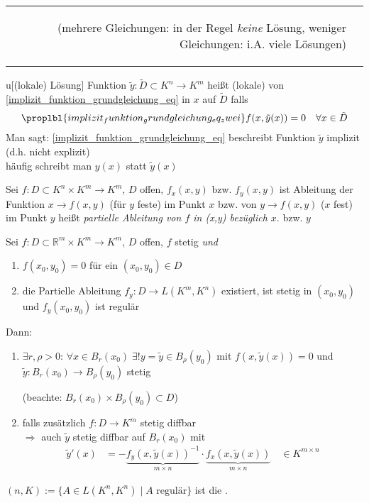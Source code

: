 \begin{example}
\begin{tabularx}{\linewidth}{r@{\ \ }X}
\begin{enumerate}[label={\alph*)}]
\begin{description}
				(mehrere Gleichungen: in der Regel \emph{keine} Lösung, weniger Gleichungen: i.A. viele Lösungen)
			\end{description}
		\end{enumerate}
	\end{tabularx}
\end{example}

\begin{*definition}u[(lokale) Lösung]
	Funktion $\tilde{y}:\tilde{D}\subset K^n\to K^m$ heißt (lokale)  von \eqref{implizit_funktion_grundgleichung_eq} in $x$ auf $\tilde{D}$ falls \begin{align}
		\proplbl{implizit_funktion_grundgleichung_eq_zwei}
		f(x,\tilde{y}(x)) = 0 \quad\forall x\in\tilde{D}
	\end{align}
	Man sagt: \eqref{implizit_funktion_grundgleichung_eq} beschreibt Funktion $\tilde{y}$ implizit (d.h. nicht explizit)\\
	häufig schreibt man $y(x)$ statt $\tilde{y}(x)$
\end{*definition}

Sei $f:D\subset K^n\times K^m\to K^m$, $D$ offen, $f_x(x,y)$ bzw. $f_y(x,y)$ ist Ableitung der Funktion $x\to f(x,y)$ (für $y$ feste) im Punkt $x$ bzw. von $y\to f(x,y)$ ($x$ fest) im Punkt $y$ heißt \emph{partielle Ableitung von $f$ in (x,y) bezüglich $x$}. bzw. $y$

\begin{theorem}
	Sei $f:D\subset \mathbb{R}^m \times K^m\to K^m$, $D$ offen, $f$ stetig \emph{und} \begin{enumerate}[label={\alph*)}]
		\item $f(x_0, y_0) = 0$ für ein $(x_0, y_0)\in D$
		\item die Partielle Ableitung $f_y:D\to L(K^m, K^n)$ existiert, ist stetig in $(x_0, y_0)$ und $f_y(x_0, y_0)$ ist regulär
	\end{enumerate}
	Dann:\begin{enumerate}[label={\arabic*)}]
		\item $\exists r,\rho > 0$: $\forall x\in B_r(x_0)\;\exists! y=\tilde{y}\in B_\rho(y_0)$ mit $f(x,\tilde{y}(x)) = 0$ und $\tilde{y}:B_r(x_0)\to B_\rho(y_0)$ stetig
		
		(beachte: $B_r(x_0)\times B_\rho(y_0)\subset D$)
		
		\item {}
		falls zusätzlich $f:D\to K^m$ stetig \gls{diffbar}\\
		$\Rightarrow$ auch $\tilde{y}$ stetig \gls{diffbar} auf $B_r(x_0)$ mit \begin{align*}
			\tilde{y}'(x) &= -\underbrace{f_y(x,\tilde{y}(x))^{-1}}_{m\times n} \cdot \underbrace{f_x(x,\tilde{y}(x))}_{m\times n}\quad\in K^{m\times n}
		\end{align*}
	\end{enumerate}

	$(n, K) := \{ A\in L(K^n, K^n) \mid A \text{ regulär} \}$ ist die .
\end{theorem}

